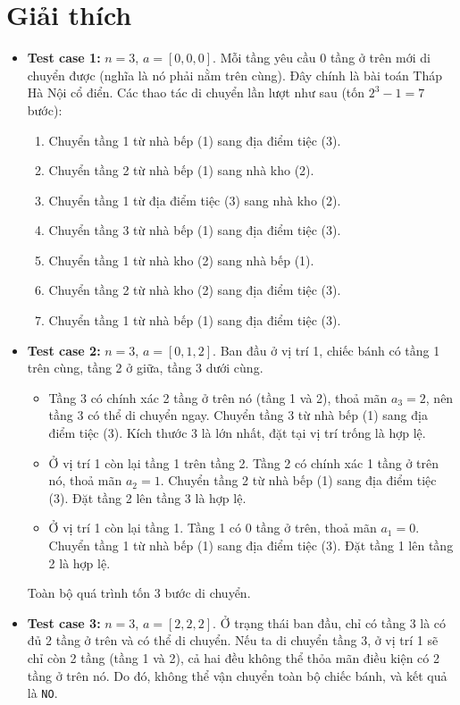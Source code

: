 \documentclass[11pt]{article}
\begin{document}
\section*{Giải thích}
\begin{itemize}
    \item \textbf{Test case 1:} $n = 3$, $a = [0, 0, 0]$. Mỗi tầng yêu cầu $0$ tầng ở trên mới di chuyển được (nghĩa là nó phải nằm trên cùng). Đây chính là bài toán Tháp Hà Nội cổ điển. Các thao tác di chuyển lần lượt như sau (tốn $2^3 - 1 = 7$ bước):
    \begin{enumerate}
        \item Chuyển tầng 1 từ nhà bếp (1) sang địa điểm tiệc (3).
        \item Chuyển tầng 2 từ nhà bếp (1) sang nhà kho (2).
        \item Chuyển tầng 1 từ địa điểm tiệc (3) sang nhà kho (2).
        \item Chuyển tầng 3 từ nhà bếp (1) sang địa điểm tiệc (3).
        \item Chuyển tầng 1 từ nhà kho (2) sang nhà bếp (1).
        \item Chuyển tầng 2 từ nhà kho (2) sang địa điểm tiệc (3).
        \item Chuyển tầng 1 từ nhà bếp (1) sang địa điểm tiệc (3).
    \end{enumerate}

    \item \textbf{Test case 2:} $n = 3$, $a = [0, 1, 2]$. Ban đầu ở vị trí 1, chiếc bánh có tầng 1 trên cùng, tầng 2 ở giữa, tầng 3 dưới cùng.
    \begin{itemize}
        \item Tầng 3 có chính xác 2 tầng ở trên nó (tầng 1 và 2), thoả mãn $a_3=2$, nên tầng 3 có thể di chuyển ngay. Chuyển tầng 3 từ nhà bếp (1) sang địa điểm tiệc (3). Kích thước 3 là lớn nhất, đặt tại vị trí trống là hợp lệ.
        \item Ở vị trí 1 còn lại tầng 1 trên tầng 2. Tầng 2 có chính xác 1 tầng ở trên nó, thoả mãn $a_2=1$. Chuyển tầng 2 từ nhà bếp (1) sang địa điểm tiệc (3). Đặt tầng 2 lên tầng 3 là hợp lệ.
        \item Ở vị trí 1 còn lại tầng 1. Tầng 1 có 0 tầng ở trên, thoả mãn $a_1=0$. Chuyển tầng 1 từ nhà bếp (1) sang địa điểm tiệc (3). Đặt tầng 1 lên tầng 2 là hợp lệ.
    \end{itemize}
    Toàn bộ quá trình tốn 3 bước di chuyển.

    \item \textbf{Test case 3:} $n = 3$, $a = [2, 2, 2]$. Ở trạng thái ban đầu, chỉ có tầng 3 là có đủ 2 tầng ở trên và có thể di chuyển. Nếu ta di chuyển tầng 3, ở vị trí 1 sẽ chỉ còn 2 tầng (tầng 1 và 2), cả hai đều không thể thỏa mãn điều kiện có 2 tầng ở trên nó. Do đó, không thể vận chuyển toàn bộ chiếc bánh, và kết quả là \texttt{NO}.
\end{itemize}
\end{document}
